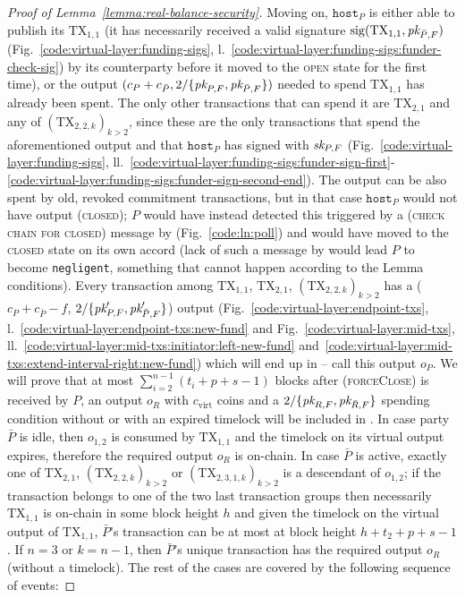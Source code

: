 \begin{proof}[Proof of Lemma~\ref{lemma:real-balance-security}]
  Moving on, $\texttt{host}_P$ is either able to publish its $\mathrm{TX}_{1,
  1}$ (it has necessarily received a valid signature
  $\mathrm{sig}(\mathrm{TX}_{1, 1}, \textit{pk}_{\bar{P}, F})$
  (Fig.~\ref{code:virtual-layer:funding-sigs},
  l.~\ref{code:virtual-layer:funding-sigs:funder-check-sig}) by its counterparty
  before it moved to the \textsc{open} state for the first time), or the output
  $(c_P + c_{\bar{P}}, 2/\{\textit{pk}_{P, F}, \textit{pk}_{\bar{P}, F}\})$ needed to spend
  $\mathrm{TX}_{1, 1}$ has already been spent. The only other transactions that
  can spend it are $\mathrm{TX}_{2, 1}$ and any of $(\mathrm{TX}_{2, 2, k})_{k >
  2}$, since these are the only transactions that spend the aforementioned
  output and that $\texttt{host}_P$ has signed with $\textit{sk}_{P, F}$
  (Fig.~\ref{code:virtual-layer:funding-sigs},
  ll.~\ref{code:virtual-layer:funding-sigs:funder-sign-first}-\ref{code:virtual-layer:funding-sigs:funder-sign-second-end}).
  The output can be also spent by old, revoked commitment transactions, but in
  that case $\texttt{host}_P$ would not have output (\textsc{closed}); $P$ would
  have instead detected this triggered by a (\textsc{check chain for closed})
  message by \environment (Fig.~\ref{code:ln:poll}) and would have moved to the
  \textsc{closed} state on its own accord (lack of such a message by
  \environment would lead $P$ to become \texttt{negligent}, something that
  cannot happen according to the Lemma conditions). Every transaction among
  $\mathrm{TX}_{1, 1}$, $\mathrm{TX}_{2, 1}$, $(\mathrm{TX}_{2, 2, k})_{k > 2}$
  has a ($c_P + c_{\bar{P}} - f$, $2/\{\textit{pk}_{P, F}', \textit{pk}_{\bar{P}, F}'\}$) output
  (Fig.~\ref{code:virtual-layer:endpoint-txs},
  l.~\ref{code:virtual-layer:endpoint-txs:new-fund} and
  Fig.~\ref{code:virtual-layer:mid-txs},
  ll.~\ref{code:virtual-layer:mid-txs:initiator:left-new-fund}
  and~\ref{code:virtual-layer:mid-txs:extend-interval-right:new-fund}) which
  will end up in \ledger{} -- call this output $o_P$. We will prove that at most
  $\sum\limits_{i=2}^{n-1}(t_i + p + s - 1)$ blocks after (\textsc{forceClose}) is
  received by $P$, an output $o_R$ with $c_{\mathrm{virt}}$ coins and a
  $2/\{\textit{pk}_{R, F}, \textit{pk}_{\bar{R}, F}\}$ spending condition without or with an
  expired timelock will be included in \ledger. In case party $\bar{P}$ is idle,
  then $o_{1, 2}$ is consumed by $\mathrm{TX}_{1, 1}$ and the timelock on its
  virtual output expires, therefore the required output $o_R$ is on-chain. In
  case $\bar{P}$ is active, exactly one of $\mathrm{TX}_{2, 1}$,
  $(\mathrm{TX}_{2, 2, k})_{k > 2}$ or $(\mathrm{TX}_{2, 3, 1, k})_{k > 2}$ is a
  descendant of $o_{1, 2}$; if the transaction belongs to one of the two last
  transaction groups then necessarily $\mathrm{TX}_{1, 1}$ is on-chain in some
  block height $h$ and given the timelock on the virtual output of
  $\mathrm{TX}_{1, 1}$, $\bar{P}$'s transaction can be at most at block height
  $h + t_2 + p + s - 1$. If $n=3$ or $k=n-1$, then $\bar{P}$'s unique
  transaction has the required output $o_R$ (without a timelock). The rest of
  the cases are covered by the following sequence of events:


\end{proof}
